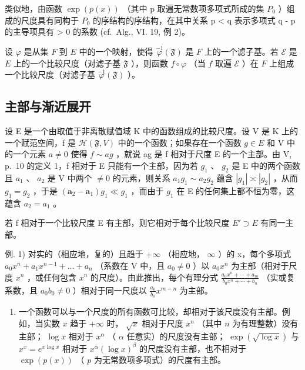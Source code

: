 类似地，由函数 \(\exp(p(x))\) （其中 p 取遍无常数项多项式所成的集 \(P_{0}\) ）组成的尺度具有同构于 \(P_{0}\) 的序结构的序结构，在其中关系 p \textless{} q 表示多项式 q - p 的主导项具有 \textgreater{} 0 的系数 (cf.~Alg., VI. 19, 例 2)。

设 \(\varphi\) 是从集 \(F\) 到 \(E\) 中的一个映射，使得 \(\overset{-1}{\varphi}(\mathfrak{F})\) 是 \(F\) 上的一个滤子基。若 \(\mathcal{E}\) 是 \(E\) 上的一个比较尺度（对滤子基 \(\mathfrak{F}\) ），则函数 \(f \circ \varphi\) （当 \(f\) 取遍 \(\mathcal{E}\) ）在 \(F\) 上组成一个比较尺度（对滤子基 \(\overset{-1}{\varphi}(\mathfrak{F})\) ）。

\subsection{主部与渐近展开}

设 E 是一个由取值于非离散赋值域 K 中的函数组成的比较尺度。设 V 是 K 上的一个赋范空间，f 是 \(\mathcal{H}(\mathfrak{F}, V)\) 中的一个函数；如果存在一个函数 \(g \in E\) 和 V 中的一个元素 \(a \neq 0\) 使得 \(f \sim ag\) ，就说 ag 是 f 相对于尺度 E 的一个主部。由 V, p.~10 的定义 1，f 相对于 E 只能有一个主部，因为若 \(g_{1}\) 、 \(g_{2}\) 是 E 中的两个函数且 \(a_{1}\) 、 \(a_{2}\) 是 V 中两个 \(\neq 0\) 的元素，则关系 \(a_{1}g_{1} \sim a_{2}g_{2}\) 蕴含 \(|g_{1}| \asymp |g_{2}|\) ，从而 \(g_{1} = g_{2}\) ，于是 \((\mathbf{a}_{2} - \mathbf{a}_{1})g_{1} \ll g_{1}\) ，而由于 \(g_{1}\) 在 E 的任何集上都不恒为零，这蕴含 \(a_{2} = a_{1}\) 。

若 f 相对于一个比较尺度 E 有主部，则它相对于每个比较尺度 \(E' \supset E\) 有同一主部。

例. 1) 对实的（相应地，复的）且趋于 \(+\infty\) （相应地， \(\infty\) ）的 x，每个多项式 \(a_{0}x^{n} + a_{1}x^{n-1} + \ldots + a_{n}\) （系数在 V 中，且 \(a_{0} \neq 0\) ）以 \(a_{0}x^{n}\) 为主部（相对于尺度 \(x^{n}\) ，或任何包含 \(x^{n}\) 的尺度）。由此推出，每个有理分式 \(\frac{a_{0}x^{n} + \cdots + a_{m}}{b_{0}x^{n} + \cdots + b_{n}}\) （实或复系数，且 \(a_{0}b_{0} \neq 0\) ）相对于同一尺度以 \(\frac{a_{0}}{b_{0}}x^{m-n}\) 为主部。

\begin{enumerate}
\def\labelenumi{\arabic{enumi})}
\setcounter{enumi}{1}
\tightlist
\item
  一个函数可以与一个尺度的所有函数可比较，却相对于该尺度没有主部。例如，当实数 \(x\) 趋于 \(+\infty\) 时， \(\sqrt{x}\) 相对于尺度 \(x^n\) （其中 \(n\) 为有理整数）没有主部； \(\log x\) 相对于 \(x^\alpha\) （ \(\alpha\) 任意实）的尺度没有主部； \(\exp(\sqrt{\log x})\) 与 \(x^x = e^{x\log x}\) 相对于 \(x^\alpha (\log x)^\beta\) 的尺度没有主部，也不相对于 \(\exp(p(x))\) （ \(p\) 为无常数项多项式）的尺度有主部。
\end{enumerate}

